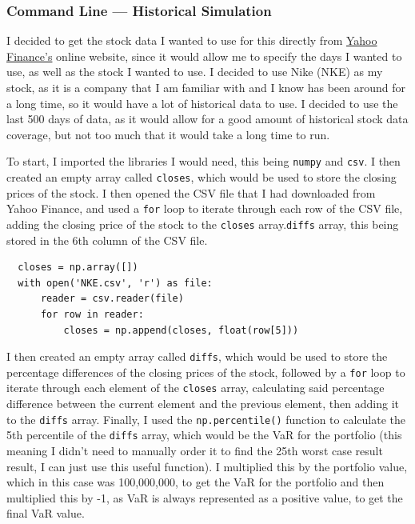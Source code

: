 \documentclass{article}
\begin{document}
\subsubsection{Command Line --- Historical Simulation}
I decided to get the stock data I wanted to use for this directly from \href{https://finance.yahoo.com/}{Yahoo Finance's} online website, since it would allow me to specify the days I wanted to use, as well as the stock I wanted to use. I decided to use Nike (NKE) as my stock, as it is a company that I am familiar with and I know has been around for a long time, so it would have a lot of historical data to use. I decided to use the last 500 days of data, as it would allow for a good amount of historical stock data coverage, but not too much that it would take a long time to run.\\\vspace{0.3cm}

To start, I imported the libraries I would need, this being \texttt{numpy} and \texttt{csv}. I then created an empty array called \texttt{closes}, which would be used to store the closing prices of the stock. I then opened the CSV file that I had downloaded from Yahoo Finance, and used a \texttt{for} loop to iterate through each row of the CSV file, adding the closing price of the stock to the \texttt{closes} array.\texttt{diffs} array, this being stored in the 6th column of the CSV file.\\\vspace{0.3cm}
\begin{verbatim}
  closes = np.array([])
  with open('NKE.csv', 'r') as file:
      reader = csv.reader(file)
      for row in reader:
          closes = np.append(closes, float(row[5]))
  \end{verbatim}

I then created an empty array called \texttt{diffs}, which would be used to store the percentage differences of the closing prices of the stock, followed by a \texttt{for} loop to iterate through each element of the \texttt{closes} array, calculating said percentage difference between the current element and the previous element, then adding it to the \texttt{diffs} array. Finally, I used the \texttt{np.percentile()} function to calculate the 5th percentile of the \texttt{diffs} array, which would be the VaR for the portfolio (this meaning I didn't need to manually order it to find the 25th worst case result result, I can just use this useful function). I multiplied this by the portfolio value, which in this case was 100,000,000, to get the VaR for the portfolio and then multiplied this by -1, as VaR is always represented as a positive value, to get the final VaR value.\\\vspace{0.3cm}
\end{document}
